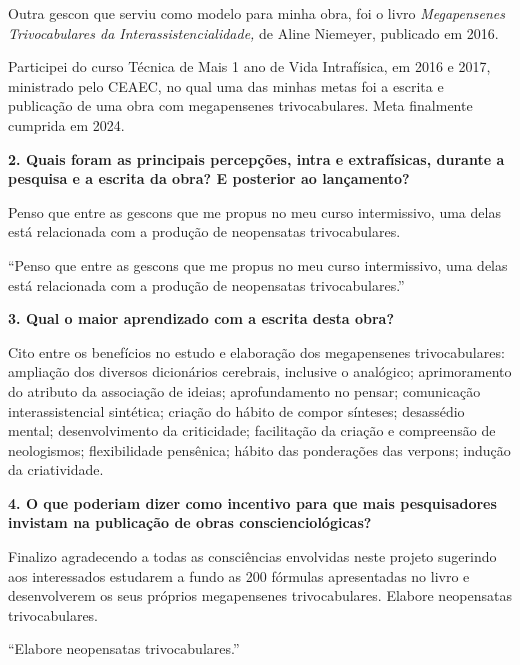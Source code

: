 \documentclass{gescons}
\begin{document}
\begin{multicols}{2}
Outra gescon que serviu como modelo  para minha obra, foi o livro \textit{Megapensenes Trivocabulares da Interassistencialidade,} de Aline Niemeyer, publicado em 2016.

Participei do curso Técnica de Mais 1 ano de Vida Intrafísica, em 2016 e 2017,  ministrado pelo CEAEC, no qual uma das minhas metas foi a escrita e publicação de uma obra com megapensenes trivocabulares. Meta finalmente cumprida em 2024.

\textbf{2.       Quais foram as principais percepções, intra e extrafísicas, durante a pesquisa e a escrita da obra? E posterior ao lançamento?}

Penso que entre as gescons que me propus no meu curso intermissivo, uma delas está relacionada com a produção de neopensatas trivocabulares. 

\begin{pullquote}
    ``Penso que entre as gescons que me propus no meu curso intermissivo, uma delas está relacionada com a produção de neopensatas trivocabulares.''
\end{pullquote}

\textbf{3.       Qual o maior aprendizado com a escrita desta obra?}

Cito entre os benefícios no estudo e elaboração dos megapensenes trivocabulares: ampliação dos diversos dicionários cerebrais, inclusive o analógico; aprimoramento do atributo da associação de ideias; aprofundamento no pensar; comunicação interassistencial sintética; criação do hábito de compor sínteses; desassédio mental; desenvolvimento da criticidade; facilitação da criação e compreensão de neologismos; flexibilidade pensênica; hábito das ponderações das verpons; indução da criatividade.


\textbf{4.       O que poderiam dizer como incentivo para que mais pesquisadores invistam na publicação de obras conscienciológicas?}

Finalizo agradecendo a todas as consciências envolvidas neste projeto sugerindo aos interessados estudarem a fundo as 200 fórmulas apresentadas no livro e desenvolverem os seus próprios megapensenes trivocabulares. Elabore neopensatas trivocabulares.


\begin{pullquote}
``Elabore neopensatas trivocabulares.''
\end{pullquote}
    
    \end{multicols}
\end{document}
